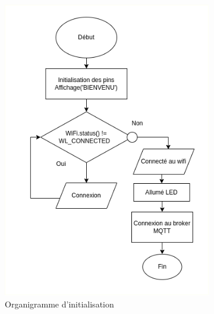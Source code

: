 \begin{figure}[H]
	\centering
	\begin{subfigure}{0.5\textwidth} %
		\centering
	\includegraphics[width=\textwidth]{./img/organigramme/initialisation.png}
	\caption{Organigramme d'initialisation}
	\label{fig:initialisation}
	\end{subfigure}
	\hfill
	\begin{subfigure}{0.45\textwidth} %
		\centering

\end{subfigure}
\end{figure}
